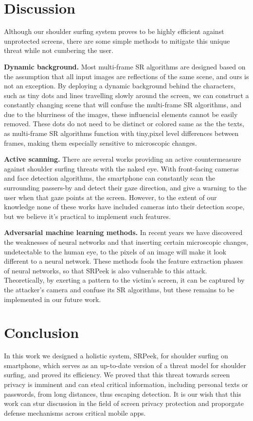 
\section{Discussion}
\label{sec-discussion}
Although our shoulder surfing system proves to be highly efficient against unprotected screens, there are some simple methods to mitigate this unique threat while not cumbering the user.

\vspace{1mm}
\noindent
\textbf{Dynamic background.} Most multi-frame SR algorithms are designed based on the assumption that all input images are reflections of the same scene, and ours is not an exception. By deploying a dynamic background behind the characters, such as tiny dots and lines travelling slowly around the screen, we can construct a constantly changing scene that will confuse the multi-frame SR algorithms, and due to the blurriness of the images, these influencial elements cannot be easily removed. These dots do not need to be distinct or colored same as the the texts, as multi-frame SR algorithms function with tiny,pixel level differences between frames, making them especially sensitive to microscopic changes.

\textbf{Active scanning.} There are several works providing an active countermeasure against shoulder surfing threats with the naked eye. With front-facing cameras and face detection algorithms, the smartphone can constantly scan the surrounding passers-by and detect their gaze direction, and give a warning to the user when that gaze points at the screen. However, to the extent of our knowledge none of these works have included cameras into their detection scope, but we believe it's practical to implement such features.

\textbf{Adversarial machine learning methods.} In recent years we have discovered the weaknesses of neural networks and that inserting certain microscopic changes, undetectable to the human eye, to the pixels of an image will make it look different to a neural network. These methods fools the feature extraction phases of neural networks, so that SRPeek is also vulnerable to this attack. Theoretically, by exerting a pattern to the victim's screen, it can be captured by the attacker's camera and confuse its SR algorithms, but these remains to be implemented in our future work.

\section{Conclusion}
\label{sec-conclusion}
In this work we designed a holistic system, SRPeek, for shoulder surfing on smartphone, which serves as an up-to-date version of a threat model for shoulder surfing, and proved its efficiency. We proved that this threat towards screen privacy is imminent and can steal critical information, including personal texts or passwords, from long distances, thus escaping detection. It is our wish that this work can stur discussion in the field of screen privacy protection and proporgate defense mechanisms across critical mobile apps.

